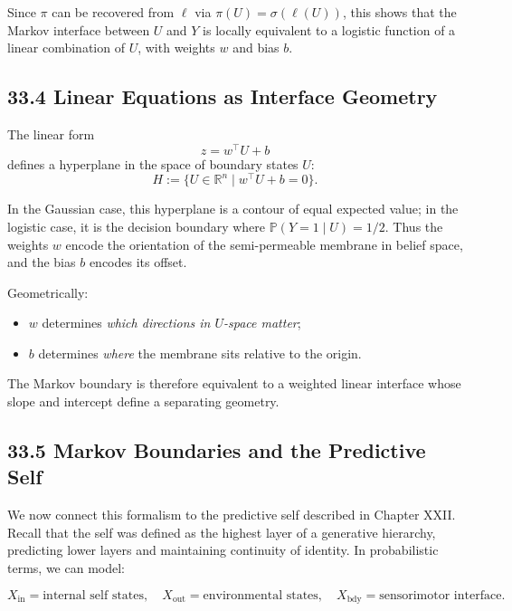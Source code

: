 \documentclass[12pt,letterpaper]{article}
\theoremstyle{remark}
\begin{document}
Since $\pi$ can be recovered from $\ell$ via $\pi(U) = \sigma(\ell(U))$, this shows that the Markov interface between $U$ and $Y$ is locally equivalent to a logistic function of a linear combination of $U$, with weights $w$ and bias $b$.

\subsection{33.4 Linear Equations as Interface Geometry}

The linear form
\[
z = w^\top U + b
\]
defines a hyperplane in the space of boundary states $U$:
\[
H := \{U \in \mathbb{R}^n \mid w^\top U + b = 0\}.
\]

In the Gaussian case, this hyperplane is a contour of equal expected value; in the logistic case, it is the decision boundary where $\mathbb{P}(Y=1 \mid U) = 1/2$. Thus the weights $w$ encode the orientation of the semi-permeable membrane in belief space, and the bias $b$ encodes its offset.

Geometrically:

\begin{itemize}
  \item $w$ determines \emph{which directions in $U$-space matter};
  \item $b$ determines \emph{where} the membrane sits relative to the origin.
\end{itemize}

The Markov boundary is therefore equivalent to a weighted linear interface whose slope and intercept define a separating geometry.

\subsection{33.5 Markov Boundaries and the Predictive Self}

We now connect this formalism to the predictive self described in Chapter XXII. Recall that the self was defined as the highest layer of a generative hierarchy, predicting lower layers and maintaining continuity of identity. In probabilistic terms, we can model:

\[
X_{\text{in}} = \text{internal self states}, \quad
X_{\text{out}} = \text{environmental states}, \quad
X_{\text{bdy}} = \text{sensorimotor interface}.
\]
\end{document}
